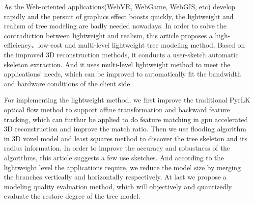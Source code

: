 
\begin{eabstract}
As the Web-oriented applications(WebVR, WebGame,
WebGIS, etc) develop rapidly and the persuit of graphics effect boosts quickly, the lightweight and realism of tree modeling are badly
needed nowadays. In order to solve the contradiction between lightweight and realism, this article proposes a high-efficiency、low-cost and
multi-level lightweight tree modeling method. Based on the improved 3D reconstruction methods, it conducts a user-sketch automatic skeleton 
extraction. And it uses multi-level lightweight method to meet the applications' needs, which can be improved to automatically fit the 
bandwidth and hardware conditions of the client side.

For implementing the lightweight method, we first improve the traditional PyrLK optical flow method to support affine transformation
and backward feature tracking, which can furthur be applied to do feature matching in gpu accelerated 3D reconstruction and 
improve the match ratio. Then we use flooding algorithm in 3D voxel model and least squares method to discover the tree skeleton and
its radius information. In order to improve the accuracy and robustness of the algorithms, this article suggests a few use sketches.
And according to the lightweight level the applications require, we reduce the model size by merging the
branches vertically and horizontally respectively. At last we propose a modeling quality evaluation method, which will objectively and 
quantizedly evaluate the restore degree of the tree model.
\end{eabstract}

